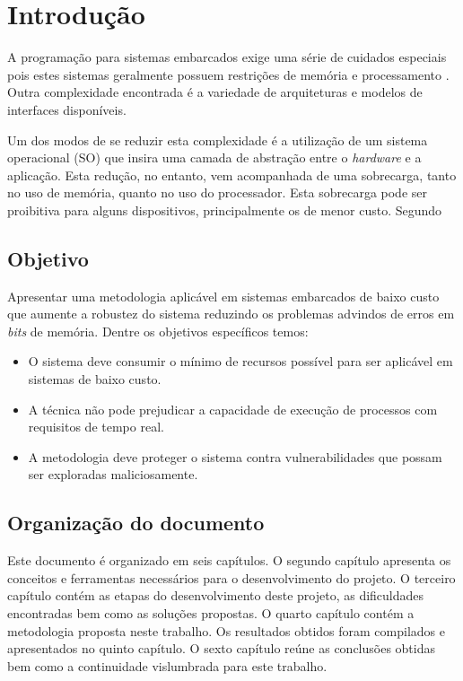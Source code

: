 \documentclass[12pt,openright,oneside,a4paper,brazil]{abntex2}
\begin{document}
\textual
\setcounter{page}{1}
\chapter{Introdução}

A programação para sistemas embarcados exige uma série de cuidados especiais pois estes sistemas geralmente possuem restrições de memória e processamento . Outra complexidade encontrada é a variedade de arquiteturas e modelos de interfaces disponíveis.

Um dos modos de se reduzir esta complexidade é a utilização de um sistema operacional (SO) que insira uma camada de abstração entre o \textit{hardware} e a aplicação. Esta redução, no entanto, vem acompanhada de uma sobrecarga, tanto no uso de memória, quanto no uso do processador. Esta sobrecarga pode ser proibitiva para alguns dispositivos, principalmente os de menor custo. Segundo \cite{aomontagem}


\section{Objetivo}

Apresentar uma metodologia aplicável em sistemas embarcados de baixo custo que aumente a robustez do sistema reduzindo os problemas advindos de erros em \textit{bits} de memória. Dentre os objetivos específicos temos:

\begin{itemize}
	\item O sistema deve consumir o mínimo de recursos possível para ser aplicável em sistemas de baixo custo.
	\item A técnica não pode prejudicar a capacidade de execução de processos com requisitos de tempo real.
	\item A metodologia deve proteger o sistema contra vulnerabilidades que possam ser exploradas maliciosamente.
\end{itemize}


\section{Organização do documento}

Este documento é organizado em seis capítulos. O segundo capítulo apresenta os conceitos e ferramentas necessários para o desenvolvimento do projeto. O terceiro capítulo contém as etapas do desenvolvimento deste projeto, as dificuldades encontradas bem como as soluções propostas. O quarto capítulo contém a metodologia proposta neste trabalho. Os resultados obtidos foram compilados e apresentados no quinto capítulo. O sexto capítulo reúne as conclusões obtidas bem como a continuidade vislumbrada para este trabalho.
\end{document}
